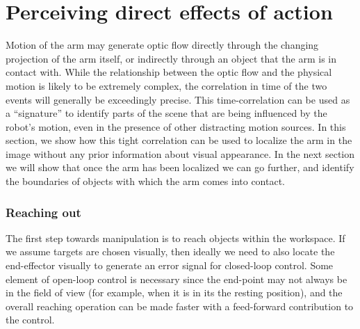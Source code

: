 
\section{Perceiving direct effects of action}

Motion of the arm may generate optic flow directly through the
changing projection of the arm itself, or indirectly through an object
that the arm is in contact with.  While the relationship between the
optic flow and the physical motion is likely to be extremely complex,
the correlation in time of the two events will generally be
exceedingly precise.  This time-correlation can be used as a
``signature'' to identify parts of the scene that are being influenced
by the robot's motion, even in the presence of other distracting
motion sources.  In this section, we show how this tight correlation
can be used to localize the arm in the image without any prior
information about visual appearance.  In the next section we will show
that once the arm has been localized we can go further, and identify
the boundaries of objects with which the arm comes into contact.

\subsubsection*{Reaching out}

The first step towards manipulation is to reach objects within the
workspace.  If we assume targets are chosen visually, then ideally we
need to also locate the end-effector visually to generate an error
signal for closed-loop control.  Some element of open-loop control is
necessary since the end-point may not always be in the field of view
(for example, when it is in its the resting position), and the overall
reaching operation can be made faster with a feed-forward contribution
to the control.

